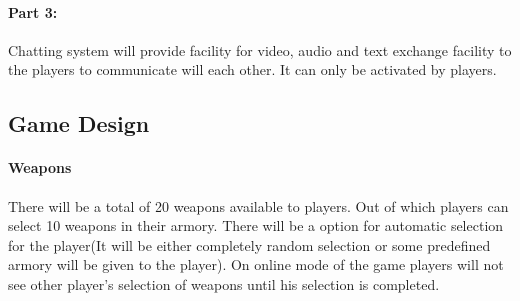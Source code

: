 \documentclass[12pt]{extarticle}
\begin{document}
\paragraph{Part 3:}	
Chatting system will provide facility for video, audio and text exchange facility to the players to communicate will each other. It can only be activated by players.

\subsection{Game Design}

\paragraph{Weapons}
There will be a total of 20 weapons available to players. Out of which players can select 10 weapons in their armory. There will be a option for automatic selection for the player(It will be either completely random selection or some predefined armory will be given to the player). On online mode of the game players will not see other player's selection of weapons until his selection is completed.
\end{document}
